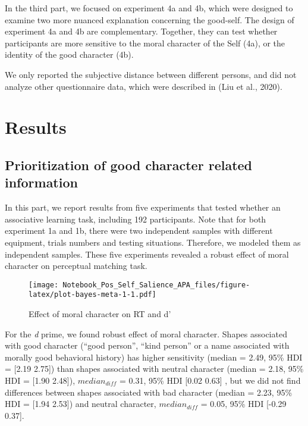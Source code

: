 \documentclass[
  man]{apa6}
\begin{document}
In the third part, we focused on experiment 4a and 4b, which were designed to examine two more nuanced explanation concerning the good-self. The design of experiment 4a and 4b are complementary. Together, they can test whether participants are more sensitive to the moral character of the Self (4a), or the identity of the good character (4b).

We only reported the subjective distance between different persons, and did not analyze other questionnaire data, which were described in (Liu et al., 2020).

\hypertarget{results}{%
\section{Results}\label{results}}

\hypertarget{prioritization-of-good-character-related-information}{%
\subsection{Prioritization of good character related information}\label{prioritization-of-good-character-related-information}}

In this part, we report results from five experiments that tested whether an associative learning task, including 192 participants. Note that for both experiment 1a and 1b, there were two independent samples with different equipment, trials numbers and testing situations. Therefore, we modeled them as independent samples. These five experiments revealed a robust effect of moral character on perceptual matching task.

\begin{figure}
\centering
\texttt{[image: Notebook\_Pos\_Self\_Salience\_APA\_files/figure-latex/plot-bayes-meta-1-1.pdf]}
\caption{\label{fig:plot-bayes-meta-1}Effect of moral character on RT and d'}
\end{figure}

For the \emph{d} prime, we found robust effect of moral character. Shapes associated with good character (``good person'', ``kind person'' or a name associated with morally good behavioral history) has higher sensitivity (median = 2.49, 95\% HDI = {[}2.19 2.75{]}) than shapes associated with neutral character (median = 2.18, 95\% HDI = {[}1.90 2.48{]}), \(median_{diff}\) = 0.31, 95\% HDI {[}0.02 0.63{]} , but we did not find differences between shapes associated with bad character (median = 2.23, 95\% HDI = {[}1.94 2.53{]}) and neutral character, \(median_{diff}\) = 0.05, 95\% HDI {[}-0.29 0.37{]}.
\end{document}
